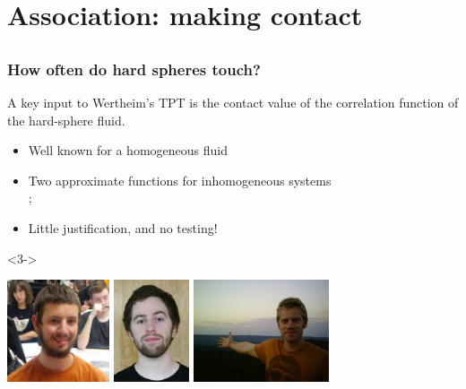 \section{Association:  making contact}
\subsection*{}

\begin{frame}
  \frametitle{How often do hard spheres touch?}

  A key input to Wertheim's TPT is the contact value of the
  correlation function of the hard-sphere fluid.
  \begin{itemize}
  \item<2-> Well known for a homogeneous fluid
  \item<2-> Two approximate functions for inhomogeneous systems
    \\ \hfill {}\tiny ;
  \item<2-> Little justification, and no testing!
  \end{itemize}
  \begin{block}{}<3->
  \begin{center}
    \includegraphics[height=3cm]{figs/HaglundChris}
    \includegraphics[height=3cm]{figs/KreitzbergPatrick}
    \includegraphics[height=3cm]{figs/SchulteJeff}
  \end{center}
  \end{block}
\end{frame}

